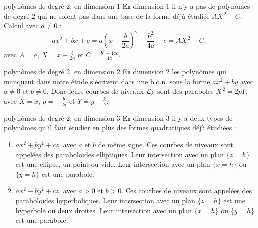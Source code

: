 \documentclass[11pt]{m53beamer}
\begin{document}
\begin{frame}{polynômes de degré 2, en dimension 1}
  En dimension $1$ il n'y a pas de polynômes de degré $2$ qui ne soient pas dans une base de la forme déjà étudiée $AX^{\,2}-C$.\pause\newline
  Calcul avec $a\neq0$ :
  \[
    ax^{2}+bx+c=a(x+\frac{b}{2a})^{2}-\frac{b^{2}}{4a}+c=AX^{\,2}-C,
  \]
  avec $A=a$, $X=x+\frac{b}{2a}$ et $C=\frac{b^{2}-4ac}{4a}$.
\end{frame}

\begin{frame}{polynômes de degré 2, en dimension 2}
  En dimension $2$ les polynômes qui manquent dans notre étude s'écrivent dans une b.o.n. sous la forme $ax^{2}+by$ avec $a\neq0$ et $b\neq0$.\pause\newline
  Donc leurs courbes de niveaux $\mathcal{L}_{k}$ sont des paraboles $X^{\,2}=2pY$, avec $X=x$, $p=-\frac{b}{2a}$ et $Y=y-\frac{k}{b}$.
\end{frame}

\begin{frame}{polynômes de degré 2, en dimension 3}
  En dimension $3$ il y a deux types de polynômes qu'il faut étudier en plus des formes quadratiques déjà étudiées :
  \begin{enumerate}[<+(1)->]
    \item $ax^{2}+by^{2}+cz$, avec $a$ et $b$ de même signe.\pause{} Ces courbes de niveaux sont appelées des \alert{paraboloïdes elliptiques}.\pause\newline
    Leur intersection avec un plan $\{z=h\}$ est une ellipse\pause, un point ou vide.\pause\newline
    Leur intersection avec un plan $\{x=h\}$ ou $\{y=h\}$ est une parabole.
    \item $ax^{2}-by^{2}+cz$, avec $a>0$ et $b>0$. \pause{} Ces courbes de niveaux sont appelées des \alert{paraboloïdes hyperboliques}.\pause\newline
    Leur intersection avec un plan $\{z=h\}$ est une hyperbole\pause{} ou deux droites.\pause\newline
    Leur intersection avec un plan $\{x=h\}$ ou $\{y=h\}$ est une parabole.
  \end{enumerate}
\end{frame}
\end{document}
